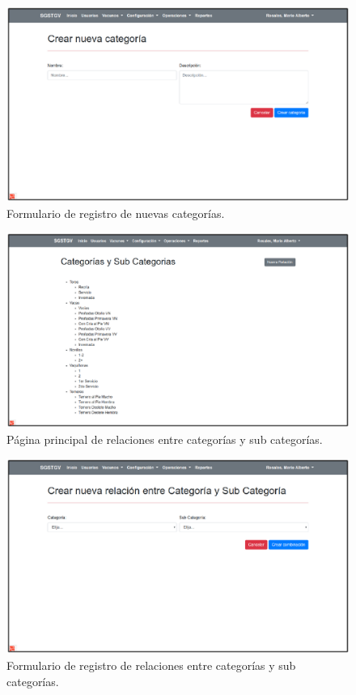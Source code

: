 \documentclass[11pt,oneside]{book}
\begin{document}
\begin{figure}[tbhp]
\centerline{\includegraphics[scale=0.87]{figs/capitulo_4_desarrollo/fig415.pdf}}
\caption{Formulario de registro de nuevas categorías.}
\label{fig415}
\end{figure}

\begin{figure}[tbhp]
\centerline{\includegraphics[scale=0.87]{figs/capitulo_4_desarrollo/fig416.pdf}}
\caption{Página principal de relaciones entre categorías y sub categorías.}
\label{fig416}
\end{figure}

\begin{figure}[tbhp]
\centerline{\includegraphics[scale=0.87]{figs/capitulo_4_desarrollo/fig417.pdf}}
\caption{Formulario de registro de relaciones entre categorías y sub categorías.}
\label{fig417}
\end{figure}
\end{document}
